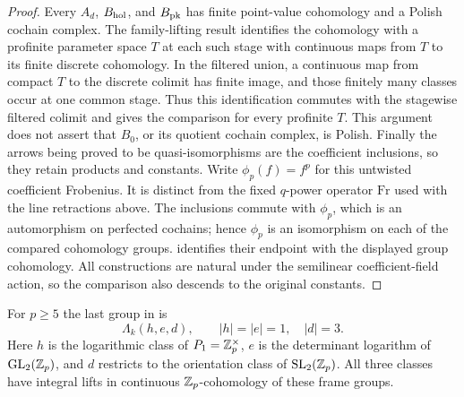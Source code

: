 \begin{proof}
Every $A_d$, $B_{\mathrm{hol}}$, and $B_{\mathrm{pk}}$ has finite point-value
cohomology and a Polish cochain complex.  The family-lifting result
 identifies the cohomology with a profinite
parameter space $T$ at each such stage with continuous maps from $T$ to
its finite discrete cohomology.  In the filtered union, a continuous
map from compact $T$ to the discrete colimit has finite image, and those
finitely many classes occur at one common stage.  Thus this identification
commutes with the stagewise filtered colimit and gives the comparison
for every profinite $T$.  This argument does not assert that $B_0$, or
its quotient cochain complex, is Polish.
Finally the arrows being proved to be quasi-isomorphisms are the
coefficient inclusions, so they retain products and constants.
Write $\phi_p(f)=f^p$ for this untwisted coefficient Frobenius.
It is distinct from the fixed $q$-power operator $\mathrm{Fr}$ used
with the line retractions above.  The inclusions commute with $\phi_p$,
which is an automorphism on perfected cochains; hence $\phi_p$ is an
isomorphism on each of the compared cohomology groups.
 identifies their endpoint with the
displayed group cohomology.  All constructions are natural under the
semilinear coefficient-field action, so the comparison also descends
to the original constants.
\end{proof}

\begin{corollary}\label{h3:ord:exterior-classes}
For $p\geq5$ the last group in  is
\[
 \Lambda_k(h,e,d),\qquad |h|=|e|=1,\quad |d|=3.
\]
Here $h$ is the logarithmic class of $P_1=\mathbb Z_p^\times$, $e$ is
the determinant logarithm of $\operatorname{GL}_2(\mathbb Z_p)$, and $d$ restricts to
the orientation class of $\operatorname{SL}_2(\mathbb Z_p)$.  All three classes have
integral lifts in continuous $\mathbb Z_p$-cohomology of these frame groups.
\end{corollary}

